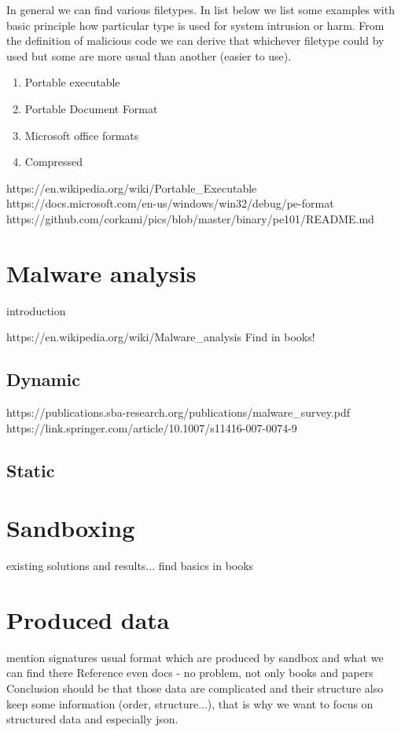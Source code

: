 In general we can find various filetypes. In list below we list some examples with basic principle how particular type is used for system intrusion or harm. From the definition of malicious code we can derive that whichever filetype could by used but some are more usual than another (easier to use).
\begin{enumerate}
  \item Portable executable
  \item Portable Document Format
  \item Microsoft office formats
  \item Compressed
\end{enumerate}

https://en.wikipedia.org/wiki/Portable_Executable
https://docs.microsoft.com/en-us/windows/win32/debug/pe-format
https://github.com/corkami/pics/blob/master/binary/pe101/README.md

\section{Malware analysis}
introduction

https://en.wikipedia.org/wiki/Malware_analysis
Find in books!

\subsection{Dynamic}
https://publications.sba-research.org/publications/malware_survey.pdf
https://link.springer.com/article/10.1007/s11416-007-0074-9
\subsection{Static}


\section{Sandboxing}
existing solutions and results...
find basics in books


\section{Produced data}
mention signatures
usual format which are produced by sandbox and what we can find there
Reference even docs - no problem, not only books and papers
Conclusion should be that those data are complicated and their structure also keep some information (order, structure...), that is why we want to focus on structured data and especially json.


